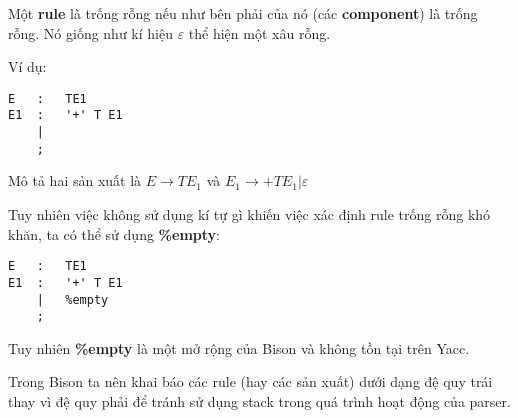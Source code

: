 \documentclass[../report.tex]{subfiles}
\begin{document}
Một \textbf{rule} là trống rỗng nếu như bên phải của nó (các 
\textbf{component}) là trống rỗng. 
\cite{empty-rules}
Nó giống như kí hiệu $\varepsilon$ thể hiện một xâu rỗng. 

Ví dụ:
\begin{lstlisting}
E   :   TE1
E1  :   '+' T E1
    | 
    ;
\end{lstlisting}
Mô tả hai sản xuất là 
$E \rightarrow TE_1$
và 
$E_1 \rightarrow +TE_1 | \varepsilon$

Tuy nhiên việc không sử dụng kí tự gì khiến việc xác định rule 
trống rỗng khó khăn, ta có thể sử dụng \textbf{\%empty}:
\begin{lstlisting}
E   :   TE1
E1  :   '+' T E1
    |   %empty
    ;
\end{lstlisting}
Tuy nhiên \textbf{\%empty} là một mở rộng của Bison và 
không tồn tại trên Yacc.

Trong Bison ta nên khai báo các rule (hay các sản xuất) dưới dạng 
đệ quy trái thay vì đệ quy phải để tránh sử dụng stack trong quá trình hoạt động của parser. \cite{left-recursion}
\end{document}
